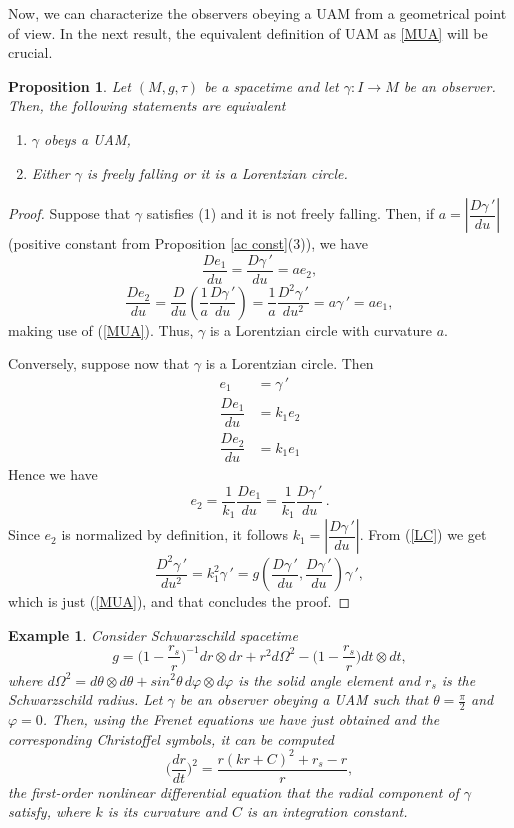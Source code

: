 \documentclass[11pt]{book}
\newtheorem{pro}[defi]{Proposition}
\newtheorem{ex}[defi]{Example}
\begin{document}
Now, we can characterize the observers obeying a UAM from a geometrical point of view. In the next result, the equivalent definition of UAM as \ref{MUA} will be crucial.
\begin{pro}\label{geometric characterization}
	Let $(M,g,\tau)$ be a spacetime and let $\gamma:I\to M$ be an observer. Then, the following statements are equivalent
	\begin{enumerate}
		\item[(1)]\label{characterization 1} $\gamma$ obeys a UAM,
		\item[(2)]\label{characterization 2} Either $\gamma$ is freely falling or it is a Lorentzian circle.
	\end{enumerate}
\end{pro}
\begin{proof}
	Suppose that $\gamma$ satisfies (1) and it is not freely falling. Then, if $a=\left|\dfrac{D\gamma{\,'}}{du}\right|$ (positive constant from Proposition \ref{ac const}(3)), we have
	\[
	\dfrac{De_1}{du}=\dfrac{D\gamma{\,'}}{du}=ae_2,
	\]
	\[	
	\dfrac{De_2}{du}=\dfrac{D}{du}\left( \dfrac{1}{a}\dfrac{D\gamma{\,'}}{du}\right)=\dfrac{1}{a}\dfrac{D^2\gamma{\,'}}{du^2}=a\gamma{\,'}=ae_1,
	\]
	making use of (\ref{MUA}). Thus, $\gamma$ is a Lorentzian circle with curvature $a$.
	
	Conversely, suppose now that $\gamma$ is a Lorentzian circle. Then
	\begin{align*}
		e_1 &=\gamma{\,'} \\
		\dfrac{De_1}{du}&=k_1 e_2 \\
		\dfrac{De_2}{du}&=k_1 e_1
	\end{align*}
	Hence we have 
	\begin{equation}\label{LC}
		e_2=\dfrac{1}{k_1}\dfrac{De_1}{du}=\dfrac{1}{k_1}\dfrac{D\gamma{\,'}}{du}\,.
	\end{equation}
	Since $e_2$ is normalized by definition, it follows $k_1=\left|\dfrac{D\gamma{\,'}}{du}\right|$. From (\ref{LC}) we get
	\[
	\dfrac{D^2\gamma{\,'}}{du^2}=k_1^2 \gamma{\,'}=g\left(\dfrac{D\gamma{\,'}}{du},\dfrac{D\gamma{\,'}}{du}\right) \gamma{\,'},
	\]
	which is just (\ref{MUA}), and that concludes the proof. 
\end{proof}

\begin{ex}\cite[Section 3]{SolutionsUAM}
	{\rm
	Consider Schwarzschild spacetime
	\[
	g=\Big(1-\frac{r_s}{r}\Big)^{-1} dr\otimes dr + r^2 d\Omega^2 - \Big(1-\frac{r_s}{r}\Big) dt\otimes dt,
	\]
	where $d\Omega^2 = d\theta \otimes d\theta + sin^2 \theta \, d\varphi \otimes d\varphi$ is the solid angle element and $r_s$ is the Schwarzschild radius. Let $\gamma$ be an observer obeying a UAM such that $\theta=\frac{\pi}{2}$ and $\varphi=0$. Then, using the Frenet equations we have just obtained and the corresponding Christoffel symbols, it can be computed
	\[
	\Big(\frac{dr}{dt}\Big)^2 = \frac{r (k r + C)^2 + r_s -r}{r},
	\] 
	the first-order nonlinear differential equation that the radial component of $\gamma$ satisfy, where $k$ is its curvature and $C$ is an integration constant.
}
\end{ex}
\end{document}
